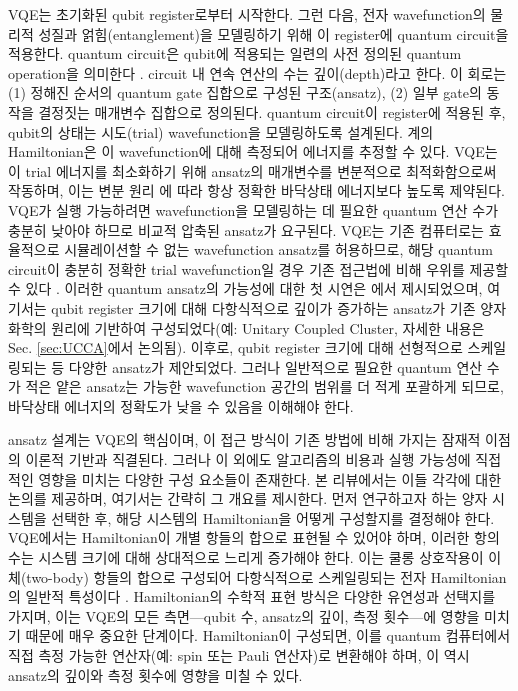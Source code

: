VQE는 초기화된 qubit register로부터 시작한다. 그런 다음, 전자 wavefunction의 물리적 성질과 얽힘(entanglement)을 모델링하기 위해 이 register에 quantum circuit을 적용한다. quantum circuit은 qubit에 적용되는 일련의 사전 정의된 quantum operation을 의미한다 \cite{nielsenQuantumComputationQuantum2010}. circuit 내 연속 연산의 수는 깊이(depth)라고 한다. 이 회로는 (1) 정해진 순서의 quantum gate 집합으로 구성된 구조(ansatz), (2) 일부 gate의 동작을 결정짓는 매개변수 집합으로 정의된다. quantum circuit이 register에 적용된 후, qubit의 상태는 시도(trial) wavefunction을 모델링하도록 설계된다. 계의 Hamiltonian은 이 wavefunction에 대해 측정되어 에너지를 추정할 수 있다. VQE는 이 trial 에너지를 최소화하기 위해 ansatz의 매개변수를 변분적으로 최적화함으로써 작동하며, 이는 변분 원리 \cite{Rayleigh1870, Ritz1908, Arfken1985}에 따라 항상 정확한 바닥상태 에너지보다 높도록 제약된다. VQE가 실행 가능하려면 wavefunction을 모델링하는 데 필요한 quantum 연산 수가 충분히 낮아야 하므로 비교적 압축된 ansatz가 요구된다. VQE는 기존 컴퓨터로는 효율적으로 시뮬레이션할 수 없는 wavefunction ansatz를 허용하므로, 해당 quantum circuit이 충분히 정확한 trial wavefunction일 경우 기존 접근법에 비해 우위를 제공할 수 있다 \cite{Peruzzo2014}. 이러한 quantum ansatz의 가능성에 대한 첫 시연은 \cite{Peruzzo2014}에서 제시되었으며, 여기서는 qubit register 크기에 대해 다항식적으로 깊이가 증가하는 ansatz가 기존 양자화학의 원리에 기반하여 구성되었다(예: Unitary Coupled Cluster, 자세한 내용은 Sec. \ref{sec:UCCA}에서 논의됨). 이후로, qubit register 크기에 대해 선형적으로 스케일링되는 \cite{Lee2019} 등 다양한 ansatz가 제안되었다. 그러나 일반적으로 필요한 quantum 연산 수가 적은 얕은 ansatz는 가능한 wavefunction 공간의 범위를 더 적게 포괄하게 되므로, 바닥상태 에너지의 정확도가 낮을 수 있음을 이해해야 한다.

ansatz 설계는 VQE의 핵심이며, 이 접근 방식이 기존 방법에 비해 가지는 잠재적 이점의 이론적 기반과 직결된다. 그러나 이 외에도 알고리즘의 비용과 실행 가능성에 직접적인 영향을 미치는 다양한 구성 요소들이 존재한다. 본 리뷰에서는 이들 각각에 대한 논의를 제공하며, 여기서는 간략히 그 개요를 제시한다. 먼저 연구하고자 하는 양자 시스템을 선택한 후, 해당 시스템의 Hamiltonian을 어떻게 구성할지를 결정해야 한다. VQE에서는 Hamiltonian이 개별 항들의 합으로 표현될 수 있어야 하며, 이러한 항의 수는 시스템 크기에 대해 상대적으로 느리게 증가해야 한다. 이는 쿨롱 상호작용이 이체(two-body) 항들의 합으로 구성되어 다항식적으로 스케일링되는 전자 Hamiltonian의 일반적 특성이다 \cite{Szabo1996}. Hamiltonian의 수학적 표현 방식은 다양한 유연성과 선택지를 가지며, 이는 VQE의 모든 측면—qubit 수, ansatz의 깊이, 측정 횟수—에 영향을 미치기 때문에 매우 중요한 단계이다. Hamiltonian이 구성되면, 이를 quantum 컴퓨터에서 직접 측정 가능한 연산자(예: spin 또는 Pauli 연산자)로 변환해야 하며, 이 역시 ansatz의 깊이와 측정 횟수에 영향을 미칠 수 있다.

